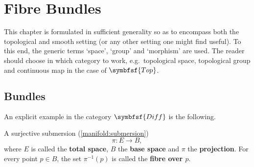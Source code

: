 \chapter{Fibre Bundles}\label{chapter:bundles}

    This chapter is formulated in sufficient generality so as to encompass both the topological and smooth setting (or any other setting one might find useful). To this end, the generic terms `space', `group' and `morphism' are used. The reader should choose in which category to work, e.g.~topological space, topological group and continuous map in the case of $\symbfsf{Top}$.

    \minitoc

\section{Bundles}


    An explicit example in the category $\symbfsf{Diff}$ is the following.
    \begin{example}
        A surjective submersion (\cref{manifold:submersion}) \[\pi:E\rightarrow B,\] where $E$ is called the \textbf{total space}, $B$ the \textbf{base space} and $\pi$ the \textbf{projection}. For every point $p\in B$, the set $\pi^{-1}(p)$ is called the \textbf{fibre over $p$}.
    \end{example}

